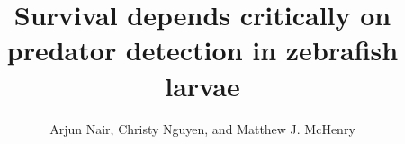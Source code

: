\documentclass[]{rsos}%
\begin{document}
\title{Survival depends critically on predator detection in zebrafish larvae}

\author{%
Arjun Nair, Christy Nguyen, and Matthew J. McHenry}

\address{Department of Ecology and Evolutionary Biology\\
University of California, Irvine\\
321 Steinhaus Hall\\
Irvine, CA 92697}

\subject{Animal behavior, biomechanics}






\maketitle




\linespread{1.6}\selectfont %
\end{document}
